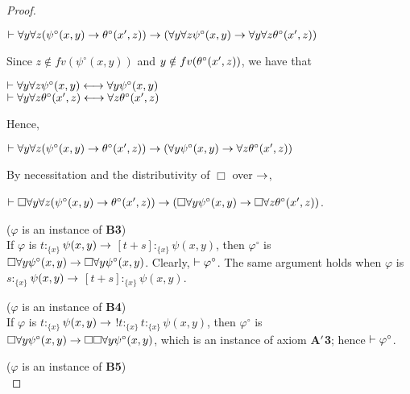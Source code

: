 \begin{proof}
\begin{center}
$\vdash \forall y\forall z (\psi^{\circ}(x,y) \rightarrow \theta^{\circ}(x^{\prime},z)) \rightarrow (\forall y\forall z  \psi^{\circ}(x,y) \rightarrow \forall y\forall z  \theta^{\circ}(x^{\prime},z))$
\end{center}
Since $z \notin fv(\psi^{\circ}(x,y))$ and $y \notin fv(\theta^{\circ}(x^{\prime},z))$, we have that


\begin{center}
$\vdash \forall y\forall z  \psi^{\circ}(x,y) \longleftrightarrow \forall y \psi^{\circ}(x,y)$\\
$\vdash \forall y\forall z  \theta^{\circ}(x^{\prime},z) \longleftrightarrow \forall z \theta^{\circ}(x^{\prime},z)$
\end{center}
Hence,

\begin{center}
$\vdash \forall y\forall z (\psi^{\circ}(x,y) \rightarrow \theta^{\circ}(x^{\prime},z)) \rightarrow (\forall y \psi^{\circ}(x,y) \rightarrow \forall z \theta^{\circ}(x^{\prime},z))$
\end{center}
By necessitation and the distributivity of $\Box$ over $\rightarrow$,

\begin{center}
$\vdash \Box  \forall y\forall z (\psi^{\circ}(x,y) \rightarrow \theta^{\circ}(x^{\prime},z)) \rightarrow (\Box \forall y \psi^{\circ}(x,y) \rightarrow \Box \forall z \theta^{\circ}(x^{\prime},z))$.
\end{center}
\vspace{5mm}

($\varphi$ is an instance of \textbf{B3})\\

\qquad If $\varphi$ is $t$$:_{\{x\}}$$\psi(x,y) \rightarrow$ $[t+s]$$:_{\{x\}}$$\psi(x,y)$, then $\varphi^{\circ}$ is $\Box  \forall y \psi^{\circ}(x,y) \rightarrow \Box  \forall y \psi^{\circ}(x,y)$. Clearly, $\vdash \varphi^{\circ}$. The same argument holds when $\varphi$ is $s$$:_{\{x\}}$$\psi(x,y) \rightarrow$ $[t+s]$$:_{\{x\}}$$\psi(x,y)$.
\vspace{5mm}

($\varphi$ is an instance of \textbf{B4})\\

\qquad If $\varphi$ is $t$$:_{\{x\}}$$\psi(x,y) \rightarrow$ $!t$$:_{\{x\}}$$t$$:_{\{x\}}$$\psi(x,y)$, then $\varphi^{\circ}$ is $\Box\forall y \psi^{\circ}(x,y) \rightarrow \Box \Box\forall y \psi^{\circ}(x,y)$, which is an instance of axiom \textbf{A$^{\prime}$3}; hence $\vdash \varphi^{\circ}$.
\vspace{5mm}



($\varphi$ is an instance of \textbf{B5})\\



\end{proof}
